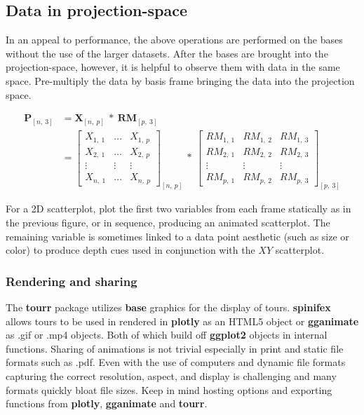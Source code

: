 \hypertarget{sec:display}{%
\subsection{Data in projection-space}\label{sec:display}}

In an appeal to performance, the above operations are performed on the bases without the use of the larger datasets. After the bases are brought into the projection-space, however, it is helpful to observe them with data in the same space. Pre-multiply the data by basis frame bringing the data into the projection space.

\begin{align}
  \textbf{P}_{[n,~3]}
    &= \textbf{X}_{[n,~p]} ~*~ \textbf{RM}_{[p,~3]} \\
    &=
      \begin{bmatrix}
          X_{1,~1} & \dots & X_{1,~p} \\
          X_{2,~1} & \dots & X_{2,~p} \\
          \vdots   & \vdots & \vdots  \\
          X_{n,~1} & \dots & X_{n,~p}
      \end{bmatrix}_{[n,~p]}
      ~*~
      \begin{bmatrix}
        RM_{1,~1} & RM_{1,~2} & RM_{1,~3} \\
        RM_{2,~1} & RM_{2,~2} & RM_{2,~3} \\
        \vdots     & \vdots     & \vdots  \\
        RM_{p,~1} & RM_{p,~2} & RM_{p,~3}
      \end{bmatrix}_{[p,~3]}
\end{align}

For a 2D scatterplot, plot the first two variables from each frame statically as in the previous figure, or in sequence, producing an animated scatterplot. The remaining variable is sometimes linked to a data point aesthetic (such as size or color) to produce depth cues used in conjunction with the \(XY\) scatterplot.

\hypertarget{rendering-and-sharing}{%
\subsubsection{Rendering and sharing}\label{rendering-and-sharing}}

The \textbf{tourr} package utilizes \textbf{base} graphics for the display of tours. \textbf{spinifex} allows tours to be used in rendered in \textbf{plotly} as an HTML5 object or \textbf{gganimate} as .gif or .mp4 objects. Both of which build off \textbf{ggplot2} objects in internal functions. Sharing of animations is not trivial especially in print and static file formats such as .pdf. Even with the use of computers and dynamic file formats capturing the correct resolution, aspect, and display is challenging and many formats quickly bloat file sizes. Keep in mind hosting options and exporting functions from \textbf{plotly}, \textbf{gganimate} and \textbf{tourr}.

